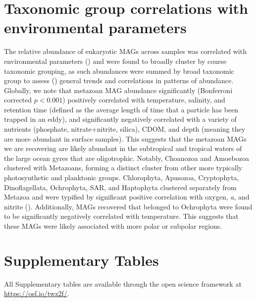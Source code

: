 \documentclass[12pt]{article}
\numberwithin{equation}{section}
\begin{document}
\section{Taxonomic group correlations with environmental parameters}
The relative abundance of eukaryotic MAGs across samples was correlated with environmental parameters () and were found to broadly cluster by course taxonomic grouping, as such abundances were summed by broad taxonomic group to assess () general trends and correlations in patterns of abundance. Globally, we note that metazoan MAG abundance significantly (Bonferroni corrected $p<0.001$) positively correlated with temperature, salinity, and retention time (defined as the average length of time that a particle has been trapped in an eddy), and significantly negatively correlated with a variety of nutrients (phosphate, nitrate+nitrite, silica), CDOM, and depth (meaning they are more abundant in surface samples). This suggests that the metazoan MAGs we are recovering are likely abundant in the subtropical and tropical waters of the large ocean gyres that are oligotrophic. Notably, Choanozoa and Amoebozoa clustered with Metazoans, forming a distinct cluster from other more typically photosynthetic and planktonic groups. Chlorophyta, Apusozoa, Cryptophyta, Dinoflagellata, Ochrophyta, SAR, and Haptophyta clustered separately from Metazoa and were typified by significant positive correlation with oxygen, \textit{a}, and nitrite (). Additionally, MAGs recovered that belonged to Ochrophyta were found to be significantly negatively correlated with temperature. This suggests that these MAGs were likely associated with more polar or subpolar regions.

\section*{Supplementary Tables}

All Supplementary tables are available through the open science framework at \url{https://osf.io/twz2f/}. 
\end{document}
